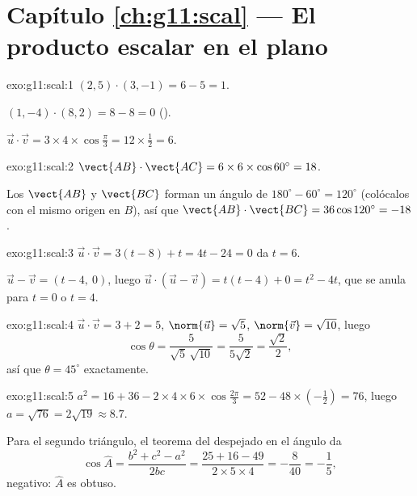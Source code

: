\section*{Capítulo \ref{ch:g11:scal} --- El producto escalar en el plano}

\begin{solution}{exo:g11:scal:1}
$(2,5)\cdot(3,-1) = 6 - 5 = 1$.

$(1,-4)\cdot(8,2) = 8 - 8 = 0$ ().

$\vec u\cdot\vec v = 3 \times 4 \times \cos\frac\pi3 = 12 \times \frac12
= 6$.
\end{solution}

\begin{solution}{exo:g11:scal:2}
$\vect{AB}\cdot\vect{AC} = 6 \times 6 \times \cos 60^\circ = 18$.

Los  $\vect{AB}$ y $\vect{BC}$ forman un ángulo de
$180^\circ - 60^\circ = 120^\circ$ (colócalos con el mismo origen en
$B$), así que $\vect{AB}\cdot\vect{BC} = 36 \cos 120^\circ = -18$.
\end{solution}

\begin{solution}{exo:g11:scal:3}
$\vec u \cdot \vec v = 3(t - 8) + t = 4t - 24 = 0$ da $t = 6$.

$\vec u - \vec v = (t - 4,\ 0)$, luego
$\vec u \cdot (\vec u - \vec v) = t(t-4) + 0 = t^2 - 4t$, que se anula
para $t = 0$ o $t = 4$.
\end{solution}

\begin{solution}{exo:g11:scal:4}
$\vec u \cdot \vec v = 3 + 2 = 5$, $\norm{\vec u} = \sqrt5$,
$\norm{\vec v} = \sqrt{10}$, luego
\[
\cos\theta = \frac{5}{\sqrt5\,\sqrt{10}} = \frac{5}{5\sqrt2}
= \frac{\sqrt2}{2},
\]
así que $\theta = 45^\circ$ exactamente.
\end{solution}

\begin{solution}{exo:g11:scal:5}
$a^2 = 16 + 36 - 2 \times 4 \times 6 \times \cos\frac{2\pi}{3}
= 52 - 48 \times \left(-\frac12\right) = 76$, luego
$a = \sqrt{76} = 2\sqrt{19} \approx 8.7$.

Para el segundo triángulo, el teorema del  despejado en el ángulo
da
\[
\cos\widehat A = \frac{b^2 + c^2 - a^2}{2bc}
= \frac{25 + 16 - 49}{2 \times 5 \times 4} = -\frac{8}{40} = -\frac15,
\]
negativo: $\widehat A$ es obtuso.
\end{solution}

